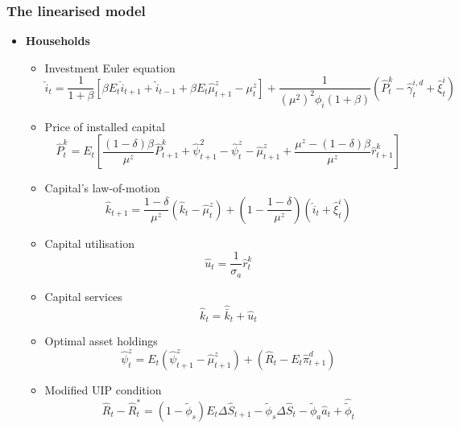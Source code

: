 \documentclass[9pt]{beamer}
\begin{document}
\begin{frame}[noframenumbering]
\frametitle{The linearised model}
\label{DomUnit5}
\begin{itemize}
    \item \textbf{Households}
    \begin{itemize}
        \item Investment Euler equation
    $$
    \hat{i}_{t}=\frac{1}{1+\beta}\left[\beta E_{t} \hat{i}_{t+1}+\hat{i}_{t-1}+\beta E_{t} \hat{\mu}_{t+1}^{z}-\mu_{t}^{z}\right]+\frac{1}{\left(\mu^{2}\right)^{2} \phi_{i}(1+\beta)}\left(\hat{P}_{t}^{k}-\hat{\gamma}_{t}^{i, d}+\hat{\xi}_{t}^{i}\right)
    $$
    
    \item Price of installed capital
    $$
    \hat{P}_{t}^{k}=E_{t}\left[\frac{(1-\delta) \beta}{\mu^{z}} \hat{P}_{t+1}^{k}+\hat{\psi}_{t+1}^{2}-\hat{\psi}_{t}^{z}-\hat{\mu}_{t+1}^{z}+\frac{\mu^{z}-(1-\delta) \beta}{\mu^{z}} \hat{r}_{t+1}^{k}\right]
    $$
    
    \item Capital's law-of-motion
    $$
    \hat{k}_{t+1}=\frac{1-\delta}{\mu^{z}}\left(\hat{k}_{t}-\hat{\mu}_{t}^{z}\right)+\left(1-\frac{1-\delta}{\mu^{z}}\right)\left(\hat{i}_{t}+\hat{\xi}_{t}^{i}\right)
    $$
    
    \item Capital utilisation
    $$
    \hat{u}_{t}=\frac{1}{\sigma_{a}} \hat{r}_{t}^{k}
    $$
    
    \item Capital services
    $$
    \hat{k}_{t}=\hat{\bar{k}}_{t}+\hat{u}_{t}
    $$
    
   \item  Optimal asset holdings
    $$
    \hat{\psi}_{t}^{z}=E_{t}\left(\hat{\psi}_{t+1}^{z}-\hat{\mu}_{t+1}^{z}\right)+\left(\hat{R}_{t}-E_{t} \hat{\pi}_{t+1}^{d}\right)
    $$
    \item Modified UIP condition
    $$
    \hat{R}_{t}-\hat{R}_{t}^{*}=\left(1-\tilde{\phi}_{s}\right) E_{t} \Delta \hat{S}_{t+1}-\tilde{\phi}_{s} \Delta \hat{S}_{t}-\tilde{\phi}_{a} \hat{a}_{t}+\hat{\tilde{\phi}}_{t}
    $$
    
    \end{itemize}
    
    
\end{itemize}
\hyperlink{frame5}{}

\end{frame}
\end{document}
